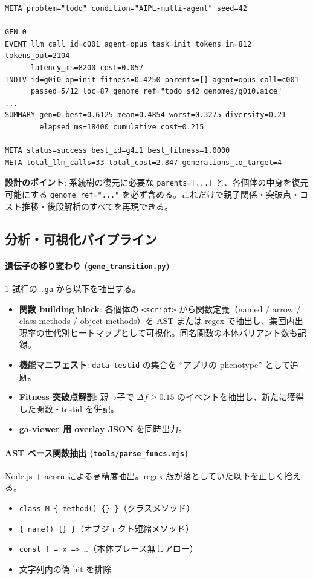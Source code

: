 \documentclass[a4paper,11pt]{ltjsarticle}
\begin{document}
\begin{lstlisting}
META problem="todo" condition="AIPL-multi-agent" seed=42

GEN 0
EVENT llm_call id=c001 agent=opus task=init tokens_in=812 tokens_out=2104
      latency_ms=8200 cost=0.057
INDIV id=g0i0 op=init fitness=0.4250 parents=[] agent=opus call=c001
      passed=5/12 loc=87 genome_ref="todo_s42_genomes/g0i0.aice"
...
SUMMARY gen=0 best=0.6125 mean=0.4854 worst=0.3275 diversity=0.21
        elapsed_ms=18400 cumulative_cost=0.215

META status=success best_id=g4i1 best_fitness=1.0000
META total_llm_calls=33 total_cost=2.847 generations_to_target=4
\end{lstlisting}

\textbf{設計のポイント}: 系統樹の復元に必要な \texttt{parents=[...]} と、各個体の中身を復元可能にする \texttt{genome\_ref="..."} を必ず含める。これだけで親子関係・突破点・コスト推移・後段解析のすべてを再現できる。

\subsection{分析・可視化パイプライン}

\paragraph{遺伝子の移り変わり (\texttt{gene\_transition.py})}
1 試行の \texttt{.ga} から以下を抽出する。
\begin{itemize}[leftmargin=2em,itemsep=2pt]
  \item \textbf{関数 building block}: 各個体の \texttt{<script>} から関数定義（named / arrow / class methods / object methods）を AST または regex で抽出し、集団内出現率の世代別ヒートマップとして可視化。同名関数の本体バリアント数も記録。
  \item \textbf{機能マニフェスト}: \texttt{data-testid} の集合を ``アプリの phenotype'' として追跡。
  \item \textbf{Fitness 突破点解剖}: 親→子で $\Delta f \geq 0.15$ のイベントを抽出し、新たに獲得した関数・testid を併記。
  \item \textbf{ga-viewer 用 overlay JSON} を同時出力。
\end{itemize}

\paragraph{AST ベース関数抽出 (\texttt{tools/parse\_funcs.mjs})}
Node.js + acorn による高精度抽出。regex 版が落としていた以下を正しく拾える。
\begin{itemize}[leftmargin=2em,itemsep=2pt]
  \item \texttt{class M \{ method() \{\} \}}（クラスメソッド）
  \item \texttt{\{ name() \{\} \}}（オブジェクト短縮メソッド）
  \item \texttt{const f = x => \dots}（本体ブレース無しアロー）
  \item 文字列内の偽 hit を排除
\end{itemize}
\end{document}
